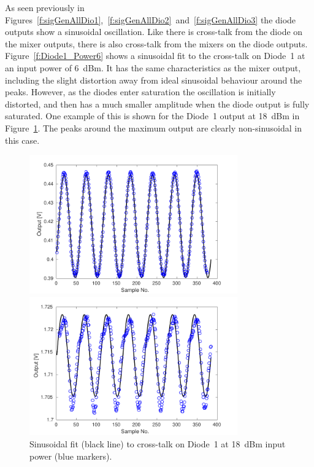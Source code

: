 As seen previously in Figures~\ref{f:sigGenAllDio1},~\ref{f:sigGenAllDio2}~and~\ref{f:sigGenAllDio3} the diode outputs show a sinusoidal oscillation. Like there is cross-talk from the diode on the mixer outputs, there is also cross-talk from the mixers on the diode outputs. Figure~\ref{f:Diode1_Power6} shows a sinusoidal fit to the cross-talk on Diode~1 at an input power of 6~dBm. It has the same characteristics as the mixer output, including the slight distortion away from ideal sinusoidal behaviour around the peaks. However, as the diodes enter saturation the oscillation is initially distorted, and then has a much smaller amplitude when the diode output is fully saturated. One example of this is shown for the Diode~1 output at 18~dBm in Figure~\ref{f:Diode1_Power18}. The peaks around the maximum output are clearly non-sinusoidal in this case.

\begin{figure}
  \centering
  \includegraphics[width=0.8\textwidth]{Figures/phaseMons/Diode1_Power6}
  \caption{Sinusoidal fit (black line) to cross-talk on Diode~1 at 6~dBm input power (blue markers).}
  \label{f:Diode1_Power6}
  \includegraphics[width=0.8\textwidth]{Figures/phaseMons/Diode1_Power18}
  \caption{Sinusoidal fit (black line) to cross-talk on Diode~1 at 18~dBm input power (blue markers).}
  \label{f:Diode1_Power18}
\end{figure}

